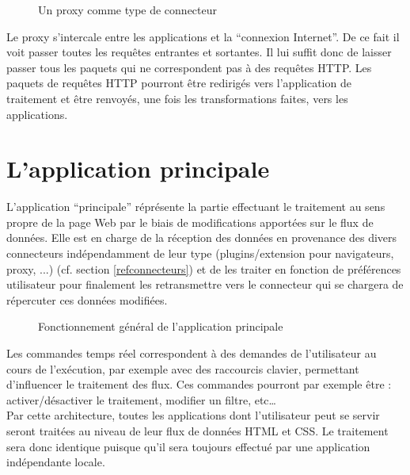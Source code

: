 \documentclass[french,a4paper]{report}
\begin{document}
{\begin{figure}[H]
\caption{Un proxy comme type de connecteur}
\end{figure}
Le proxy s'intercale entre les applications et la \enquote{connexion Internet}. De ce fait il voit
passer toutes les requêtes entrantes et sortantes. Il lui suffit donc de laisser passer tous
les paquets qui ne correspondent pas à des requêtes HTTP. Les paquets de requêtes HTTP pourront
être redirigés vers l'application de traitement et être renvoyés, une fois les transformations
faites, vers les applications.
\section{L'application principale}
L'application \enquote{principale} réprésente la partie effectuant le
traitement au sens propre de la page Web par le biais de modifications
apportées sur le flux de données. Elle est en charge de la réception
des données en provenance des divers connecteurs indépendamment de
leur type (plugins/extension pour navigateurs, proxy, ...)
(cf. section \ref{refconnecteurs}) et de les traiter en fonction de
préférences utilisateur pour finalement les retransmettre vers le
connecteur qui se chargera de répercuter ces données modifiées.
\begin{figure}[H]
\centering
{}
\caption{Fonctionnement général de l'application principale}
\end{figure}
Les commandes temps réel correspondent à des demandes de l'utilisateur
au cours de l'exécution, par exemple avec des raccourcis clavier, permettant
d'influencer le traitement des flux. Ces commandes pourront par
exemple être : activer/désactiver le traitement, modifier un filtre,
etc\dots\\
Par cette architecture, toutes les applications dont l'utilisateur
peut se servir seront traitées au niveau de leur flux de données HTML
et CSS. Le traitement sera donc identique puisque qu'il sera toujours
effectué par une application indépendante locale.
}
\end{document}
